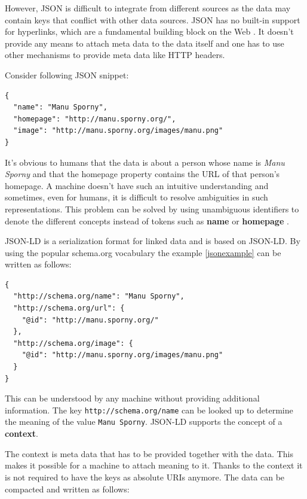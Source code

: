 However, JSON is difficult to integrate from different sources as the data may contain keys that conflict with other data sources. JSON has no built-in support for hyperlinks, which are a fundamental building block on the Web \citep{jsonldbasicconcepts}. It doesn't provide any means to attach meta data to the data itself and one has to use other mechanisms to provide meta data like HTTP headers.

Consider following JSON snippet:

\lstset{language=JSON}
\begin{lstlisting}[caption=Data of a person in the JSON format, label=jsonexample]
{
  "name": "Manu Sporny",
  "homepage": "http://manu.sporny.org/",
  "image": "http://manu.sporny.org/images/manu.png"
}
\end{lstlisting}

It's obvious to humans that the data is about a person whose name is \textit{Manu Sporny} and that the homepage property contains the URL of that person's homepage. A machine doesn't have such an intuitive understanding and sometimes, even for humans, it is difficult to resolve ambiguities in such representations. This problem can be solved by using unambiguous identifiers to denote the different concepts instead of tokens such as \textbf{name} or \textbf{homepage} \citep{jsonldbasicconcepts}.

JSON-LD is a serialization format for linked data and is based on JSON-LD. By using the popular schema.org vocabulary the example \ref{jsonexample} can be written as follows:

\lstset{language=JSON}
\begin{lstlisting}[caption=Data of a person in the JSON-LD format, label=jsonldexample]
{
  "http://schema.org/name": "Manu Sporny",
  "http://schema.org/url": {
    "@id": "http://manu.sporny.org/"
  },
  "http://schema.org/image": {
    "@id": "http://manu.sporny.org/images/manu.png"
  }
}
\end{lstlisting}

This can be understood by any machine without providing additional information. The key \lstinline{http://schema.org/name} can be looked up to determine the meaning of the value \lstinline{Manu Sporny}. JSON-LD supports the concept of a \textbf{context}.

The context is meta data that has to be provided together with the data. This makes it possible for a machine to attach meaning to it. Thanks to the context it is not required to have the keys as absolute URIs anymore. The data can be compacted and written as follows:

